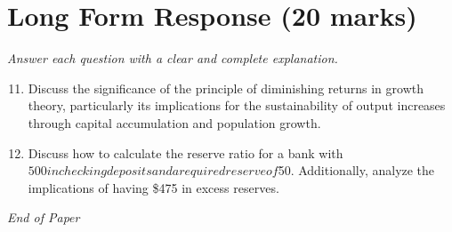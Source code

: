 \documentclass[12pt]{article}
\begin{document}
\section*{Long Form Response (20 marks)}
\textit{Answer each question with a clear and complete explanation.}
\begin{enumerate}[label=\arabic*.]
\setcounter{enumi}{10}
\item Discuss the significance of the principle of diminishing returns in growth theory, particularly its implications for the sustainability of output increases through capital accumulation and population growth.
\item Discuss how to calculate the reserve ratio for a bank with $500 in checking deposits and a required reserve of $50. Additionally, analyze the implications of having \$475 in excess reserves.
\end{enumerate}

\vfill
\noindent\textit{End of Paper}
\end{document}
